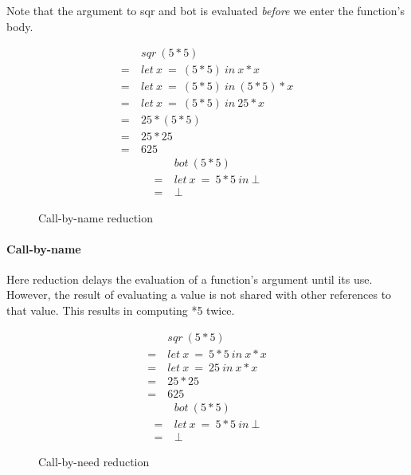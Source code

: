 Note that the argument to \<sqr\> and \<bot\> is evaluated \emph{before}
we enter the function's body. 

\pagebreak

\begin{figure}[!h]
\centering
\begin{multicols}{2}
\noindent
\begin{align*}
     &sqr\ (5*5) \\
  =\ &let\ x \  =\ (5*5)\ in\ x * x \\
  =\ &let\ x \  =\ (5*5)\ in\ (5*5) * x \\
  =\ &let\ x \  =\ (5*5)\ in\ 25 * x \\
  =\ &25 * (5*5) \\
  =\ &25 * 25 \\
  =\ &625
\end{align*}
\begin{align*}
     &bot\ (5*5) \\
  =\ &let\ x\ =\ 5*5\ in\ \bot \\
  =\ &\bot
\end{align*}
\end{multicols}
\caption{Call-by-name reduction}
\label{fig:call-by-name}
\end{figure}

\paragraph{Call-by-name} Here reduction delays the evaluation of a function's
argument until its use.  However, the result of evaluating a value is not
shared with other references to that value. This results in computing *5\>
twice.

\begin{figure}[!h]
\centering
\begin{multicols}{2}
\noindent
\begin{align*}
     &sqr\ (5*5) \\
  =\ &let\ x\ =\ 5 * 5\ in\ x * x \\
  =\ &let\ x\ =\ 25\ in\ x * x \\
  =\ &25 * 25 \\
  =\ &625
\end{align*}
\begin{align*}
     &bot\ (5*5) \\
  =\ &let\ x\ =\ 5*5\ in\ \bot \\
  =\ &\bot
\end{align*}
\end{multicols}
\caption{Call-by-need reduction}
\label{fig:call-by-need}
\end{figure}


